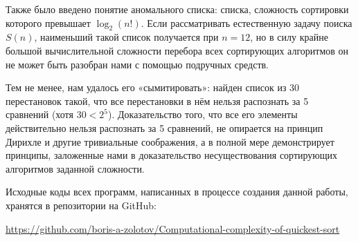 \abz Также было введено понятие аномального списка: списка, сложность сортировки которого превышает $\log_2 (n!)$. Если рассматривать естественную задачу поиска $S(n)$, наименьший такой список получается при $n=12$, но в силу крайне большой вычислительной сложности перебора всех сортирующих алгоритмов он не может быть разобран нами с помощью подручных средств.

\abz Тем не менее, нам удалось его «сымитировать»: найден список из 30 перестановок такой, что все перестановки в нём нельзя распознать за 5 сравнений (хотя $30 < 2^5$). Доказательство того, что все его элементы действительно нельзя распознать за 5 сравнений, не опирается на принцип Дирихле и другие тривиальные соображения, а в полной мере демонстрирует принципы, заложенные нами в доказательство несуществования сортирующих алгоритмов заданной сложности.

\abz Исходные коды всех программ, написанных в процессе создания данной работы, хранятся в репозитории на GitHub:

\begin{center}
	\url{https://github.com/boris-a-zolotov/Computational-complexity-of-quickest-sort}
\end{center}